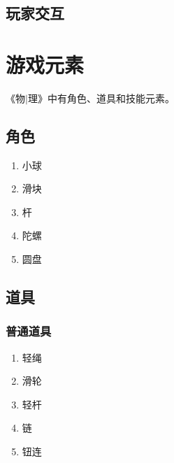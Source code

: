 \documentclass{tstextbook}
\begin{document}
\section{玩家交互}


\chapter{游戏元素}

\begin{summary}
《物$|$理》中有角色、道具和技能元素。
\end{summary}

\section{角色}

\begin{enumerate}

\item{小球}

\item{滑块}

\item{杆}

\item{陀螺}

\item{圆盘}

\end{enumerate}

\section{道具}

\subsection{普通道具}

\begin{enumerate}

\item{轻绳}

\item{滑轮}

\item{轻杆}

\item{链}

\item{钮连}

\end{enumerate}
\end{document}
